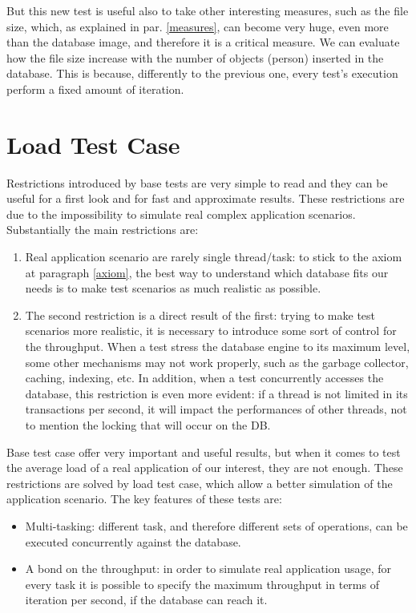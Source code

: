 But this new test is useful also to take other interesting measures, such as the file size, which, as explained in par. \ref{measures}, can become very huge, even more than the database image, and therefore it is a critical measure. We can evaluate how the file size increase with the number of objects (person) inserted in the database. This is because, differently to the previous one, every test's execution perform a fixed amount of iteration. 

	\section{Load Test Case} \label{load-test-case}
Restrictions introduced by base tests are very simple to read and they can be useful for a first look and for fast and approximate results. These restrictions are due to the impossibility to simulate real complex application scenarios. Substantially the main restrictions are:
\begin{enumerate}
	\item Real application scenario are rarely single thread/task: to stick to the axiom at paragraph \ref{axiom}, the best way to understand which database fits our needs is to make test scenarios as much realistic as possible.
	\item The second restriction is a direct result of the first: trying to make test scenarios more realistic, it is necessary to introduce some sort of control for the throughput. When a test stress the database engine to its maximum level, some other mechanisms may not work properly, such as the garbage collector, caching, indexing, etc. In addition, when a test concurrently accesses the database, this restriction is even more evident: if a thread is not limited in its transactions per second, it will impact the performances of other threads, not to mention the locking that will occur on the DB.
\end{enumerate}

Base test case offer very important and useful results, but when it comes to test the average load of a real application of our interest, they are not enough. These restrictions are solved by load test case, which allow a better simulation of the application scenario. The key features of these tests are:
\begin{itemize}
	\item Multi-tasking: different task, and therefore different sets of operations, can be executed concurrently against the database.
	\item A bond on the throughput: in order to simulate real application usage, for every task it is possible to specify the maximum throughput in terms of iteration per second, if the database can reach it.
\end{itemize}

